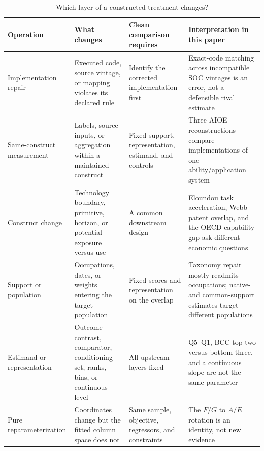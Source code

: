 \begin{table}[!htbp]
\centering
\caption{Which layer of a constructed treatment changes?}\label{tab:architectures}
\begin{threeparttable}
\small
\setlength{\tabcolsep}{4pt}
\begin{tabularx}{\textwidth}{@{}p{}YYp{0.22\textwidth}@{}}
\toprule
Operation & What changes & Clean comparison requires & Interpretation in this paper \\
\midrule
Implementation repair & Executed code, source vintage, or mapping violates its declared rule & Identify the corrected implementation first & Exact-code matching across incompatible SOC vintages is an error, not a defensible rival estimate \\
Same-construct measurement & Labels, source inputs, or aggregation within a maintained construct & Fixed support, representation, estimand, and controls & Three AIOE reconstructions compare implementations of one ability/application system \\
Construct change & Technology boundary, primitive, horizon, or potential exposure versus use & A common downstream design & Eloundou task acceleration, Webb patent overlap, and the OECD capability gap ask different economic questions \\
Support or population & Occupations, dates, or weights entering the target population & Fixed scores and representation on the overlap & Taxonomy repair mostly readmits occupations; native- and common-support estimates target different populations \\
Estimand or representation & Outcome contrast, comparator, conditioning set, ranks, bins, or continuous level & All upstream layers fixed & Q5--Q1, BCC top-two versus bottom-three, and a continuous slope are not the same parameter \\
Pure reparameterization & Coordinates change but the fitted column space does not & Same sample, objective, regressors, and constraints & The $F/G$ to $A/E$ rotation is an identity, not new evidence \\
\bottomrule
\end{tabularx}
\end{threeparttable}
\end{table}
